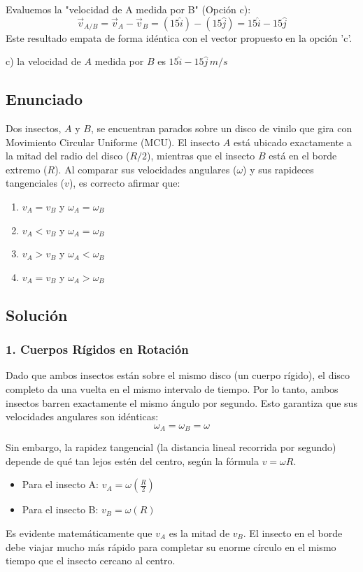 \documentclass[12pt, a4paper]{article}
\begin{document}
Evaluemos la "velocidad de A medida por B" (Opción c):
$$ \vec{v}_{A/B} = \vec{v}_A - \vec{v}_B = (15\hat{i}) - (15\hat{j}) = 15\hat{i} - 15\hat{j} $$
Este resultado empata de forma idéntica con el vector propuesto en la opción 'c'.

\begin{tcolorbox}[colback=green!5!white, colframe=green!50!black, title=Respuesta Final]
\centering \Large c) la velocidad de $A$ medida por $B$ es $15\hat{i} - 15\hat{j} \,\si{m/s}$
\end{tcolorbox}

\newpage

\subsection*{Enunciado}
Dos insectos, $A$ y $B$, se encuentran parados sobre un disco de vinilo que gira con Movimiento Circular Uniforme (MCU). El insecto $A$ está ubicado exactamente a la mitad del radio del disco ($R/2$), mientras que el insecto $B$ está en el borde extremo ($R$). Al comparar sus velocidades angulares ($\omega$) y sus rapideces tangenciales ($v$), es correcto afirmar que:
\begin{enumerate}[label=\alph*)]
    \item $v_A = v_B$ y $\omega_A = \omega_B$
    \item $v_A < v_B$ y $\omega_A = \omega_B$
    \item $v_A > v_B$ y $\omega_A < \omega_B$
    \item $v_A = v_B$ y $\omega_A > \omega_B$
\end{enumerate}

\subsection*{Solución}

\subsubsection*{1. Cuerpos Rígidos en Rotación}
Dado que ambos insectos están sobre el mismo disco (un cuerpo rígido), el disco completo da una vuelta en el mismo intervalo de tiempo. Por lo tanto, ambos insectos barren exactamente el mismo ángulo por segundo. Esto garantiza que sus velocidades angulares son idénticas:
$$ \omega_A = \omega_B = \omega $$

Sin embargo, la rapidez tangencial (la distancia lineal recorrida por segundo) depende de qué tan lejos estén del centro, según la fórmula $v = \omega R$.
\begin{itemize}
    \item Para el insecto A: $v_A = \omega \left(\frac{R}{2}\right)$
    \item Para el insecto B: $v_B = \omega (R)$
\end{itemize}
Es evidente matemáticamente que $v_A$ es la mitad de $v_B$. El insecto en el borde debe viajar mucho más rápido para completar su enorme círculo en el mismo tiempo que el insecto cercano al centro.
\end{document}
